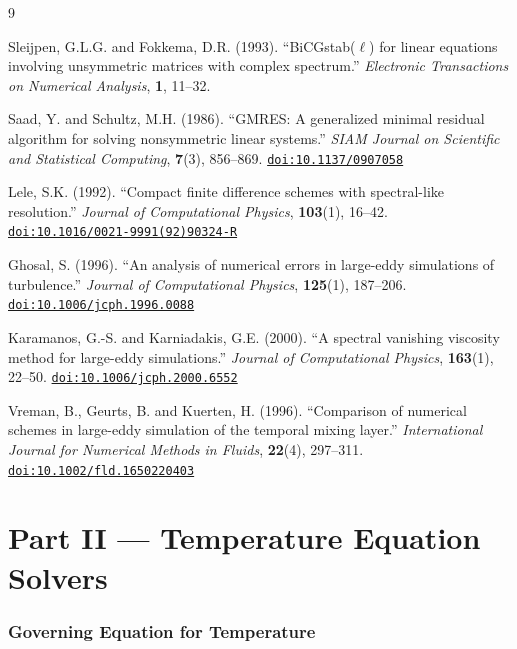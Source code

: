 \documentclass[12pt,a4paper]{article}
\newcommand{\doi}[1]{\href{https://doi.org/#1}{\texttt{doi:#1}}}
\begin{document}
	\begin{thebibliography}{9}

	Sleijpen, G.L.G. and Fokkema, D.R. (1993).
	``BiCGstab($\ell$) for linear equations involving unsymmetric matrices
	with complex spectrum.''
	\textit{Electronic Transactions on Numerical Analysis}, \textbf{1}, 11--32.

	Saad, Y. and Schultz, M.H. (1986).
	``GMRES: A generalized minimal residual algorithm for solving nonsymmetric
	linear systems.''
	\textit{SIAM Journal on Scientific and Statistical Computing},
	\textbf{7}(3), 856--869.
	\doi{10.1137/0907058}

	Lele, S.K. (1992).
	``Compact finite difference schemes with spectral-like resolution.''
	\textit{Journal of Computational Physics}, \textbf{103}(1), 16--42.
	\doi{10.1016/0021-9991(92)90324-R}

	Ghosal, S. (1996).
	``An analysis of numerical errors in large-eddy simulations of turbulence.''
	\textit{Journal of Computational Physics}, \textbf{125}(1), 187--206.
	\doi{10.1006/jcph.1996.0088}

	Karamanos, G.-S. and Karniadakis, G.E. (2000).
	``A spectral vanishing viscosity method for large-eddy simulations.''
	\textit{Journal of Computational Physics}, \textbf{163}(1), 22--50.
	\doi{10.1006/jcph.2000.6552}

	Vreman, B., Geurts, B. and Kuerten, H. (1996).
	``Comparison of numerical schemes in large-eddy simulation of the
	temporal mixing layer.''
	\textit{International Journal for Numerical Methods in Fluids},
	\textbf{22}(4), 297--311.
	\doi{10.1002/fld.1650220403}

	\end{thebibliography}

\clearpage
\part*{Part II — Temperature Equation Solvers}

\section{Governing Equation for Temperature}
\label{sec:teqn-governing}
\end{document}
